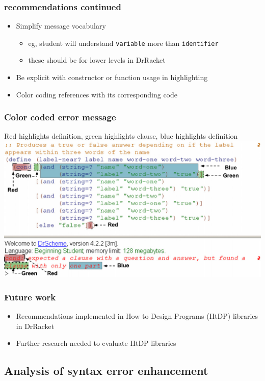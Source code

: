 \documentclass{beamer}
\begin{document}
\begin{frame}[fragile]
	\frametitle{recommendations continued}
		\begin{itemize}
			\item Simplify message vocabulary
				\begin{itemize}
					\item eg, student will understand \texttt{variable} more than \texttt{identifier}
					\item these should be for lower levels in DrRacket
				\end{itemize}
			\item Be explicit with constructor or function usage in highlighting
			\item Color coding references with its corresponding code
		\end{itemize}

\end{frame}

\begin{frame}
	\frametitle{Color coded error message}
	Red highlights definition, green highlights clause, blue highlights definition
	\center
		\includegraphics[keepaspectratio, width=0.8 \textwidth]{ColorCodedMessage.pdf}
\end{frame}

\begin{frame}
	\frametitle{Future work}
		\begin{itemize}
			\item Recommendations implemented in How to Design Programs (HtDP) libraries in DrRacket
			\item Further research needed to evaluate HtDP libraries
		\end{itemize}

\end{frame}

\subsection[Syntax error enhancement]{Analysis of syntax error enhancement}
\end{document}

